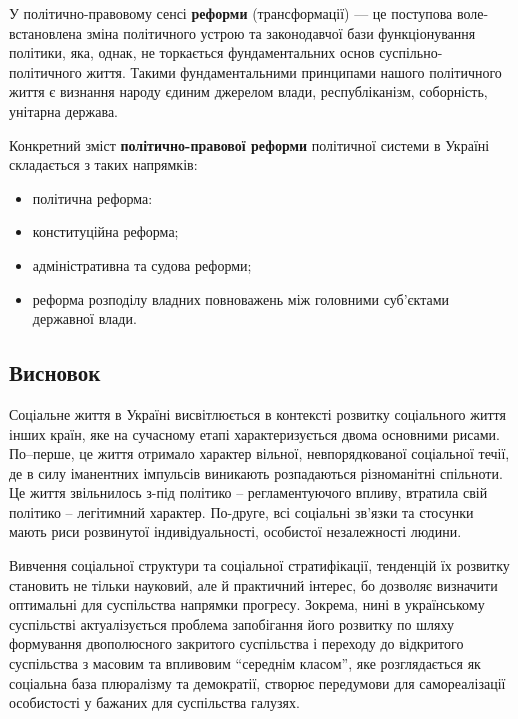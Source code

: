 У політично-правовому сенсі \textbf{реформи} (трансформації) — це поступова воле-встановлена зміна політичного устрою та законодавчої бази функціонування політики, яка, однак, не торкається фундаментальних основ суспільно-політичного життя. Такими фундаментальними принципами нашого політичного життя є визнання народу єдиним джерелом влади, республіканізм, соборність, унітарна держава.

Конкретний зміст \textbf{політично-правової реформи} політичної системи в Україні складається з таких напрямків:
\begin{itemize}
\item політична реформа:
\item конституційна реформа;
\item адміністративна та судова реформи;
\item реформа розподілу владних повноважень між головними суб'єктами державної влади.
\end{itemize}
\subsection{Висновок}
Соціальне життя в Україні висвітлюється в контексті розвитку соціального життя інших країн, яке на сучасному етапі характеризується двома основними рисами. По–перше, це життя отримало характер вільної, невпорядкованої соціальної течії, де в силу іманентних імпульсів виникають розпадаються різноманітні спільноти. Це життя звільнилось з-під політико – регламентуючого впливу, втратила свій політико – легітимний характер. По-друге, всі соціальні зв’язки та стосунки мають риси розвинутої індивідуальності, особистої незалежності людини.

Вивчення соціальної структури та соціальної стратифікації, тенденцій їх розвитку становить не тільки науковий, але й практичний інтерес, бо дозволяє визначити оптимальні для суспільства напрямки прогресу. Зокрема, нині в українському суспільстві актуалізується проблема запобігання його розвитку по шляху формування двополюсного закритого суспільства і переходу до відкритого суспільства з масовим та впливовим “середнім класом”, яке розглядається як соціальна база плюралізму та демократії, створює передумови для самореалізації особистості у бажаних для суспільства галузях. 